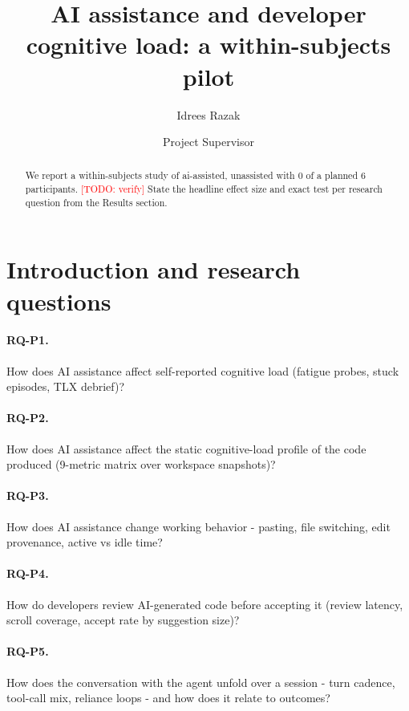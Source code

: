 \documentclass[11pt]{article}
\title{AI assistance and developer cognitive load: a within-subjects pilot}
\author{Idrees Razak \and Project Supervisor}
\date{}
\newcommand{\todo}[1]{\textcolor{red}{[TODO: #1]}}
\begin{document}
\maketitle

\begin{abstract}
We report a within-subjects study of ai-assisted, unassisted with 0 of a planned 6 participants. \todo{verify} State the headline effect size and exact test per research question from the Results section.
\end{abstract}

\section{Introduction and research questions}

\paragraph{RQ-P1.} How does AI assistance affect self-reported cognitive load (fatigue probes, stuck episodes, TLX debrief)?

\paragraph{RQ-P2.} How does AI assistance affect the static cognitive-load profile of the code produced (9-metric matrix over workspace snapshots)?

\paragraph{RQ-P3.} How does AI assistance change working behavior - pasting, file switching, edit provenance, active vs idle time?

\paragraph{RQ-P4.} How do developers review AI-generated code before accepting it (review latency, scroll coverage, accept rate by suggestion size)?

\paragraph{RQ-P5.} How does the conversation with the agent unfold over a session - turn cadence, tool-call mix, reliance loops - and how does it relate to outcomes?
\end{document}
